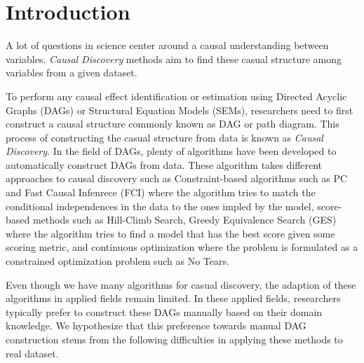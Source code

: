 \documentclass[letterpaper]{article} %
\begin{document}
\section{Introduction}

A lot of questions in science center around a causal understanding between 
variables. \emph{Causal Discovery} methods aim to find these casual structure
among variables from a given dataset.

To perform any causal effect identification or estimation using Directed
Acyclic Graphs (DAGs) or Structural Equation Models (SEMs), researchers need to
first construct a causal structure commonly known as DAG or path diagram. This
process of constructing the casual structure from data is known as \emph{Causal
Discovery}. In the field of DAGs, plenty of algorithms have been developed to
automatically construct DAGs from data. These algorithm takes different
approaches to causal discovery such as Constraint-based algorithms such as PC
and Fast Causal Infenrece (FCI) where the algorithm tries to match the
conditional independences in the data to the ones impled by the model,
score-based methods such as Hill-Climb Search, Greedy Equivalence Search (GES)
where the algorithm tries to find a model that has the best score given some
scoring metric, and continuous optimization where the problem is formulated as
a constrained optimization problem such as No Tears.

Even though we have many algorithms for casual discovery, the adaption of these
algorithms in applied fields remain limited. In these applied fields, researchers 
typically prefer to construct these DAGs manually based on their domain knowledge.
We hypothesize that this preference towards manual DAG construction stems from the 
following difficulties in applying these methods to real dataset. 
\end{document}
